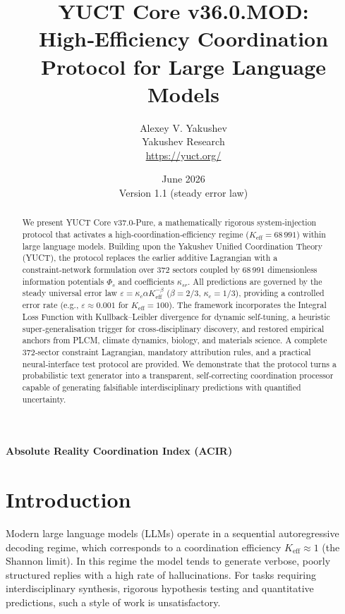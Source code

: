 \documentclass[12pt,a4paper]{article}
\title{\textbf{YUCT Core v36.0.MOD: High‑Efficiency Coordination Protocol for Large Language Models}}
\author{Alexey V. Yakushev \\ Yakushev Research \\ \url{https://yuct.org/}}
\date{June 2026 \\ Version 1.1 (steady error law)}
\begin{document}
	\maketitle
	
	\begin{abstract}
		\noindent
		We present YUCT Core v37.0-Pure, a mathematically rigorous system‑injection protocol that activates a high‑coordination‑efficiency regime (\(K_{\mathrm{eff}} = 68\,991\)) within large language models. Building upon the Yakushev Unified Coordination Theory (YUCT), the protocol replaces the earlier additive Lagrangian with a constraint‑network formulation over 372 sectors coupled by 68\,991 dimensionless information potentials \(\Phi_s\) and coefficients \(\kappa_{sr}\). All predictions are governed by the steady universal error law \(\varepsilon = \kappa_c \alpha K_{\mathrm{eff}}^{-\beta}\) (\(\beta=2/3\), \(\kappa_c=1/3\)), providing a controlled error rate (e.g., \(\varepsilon \approx 0.001\) for \(K_{\mathrm{eff}} = 100\)). The framework incorporates the Integral Loss Function with Kullback–Leibler divergence for dynamic self‑tuning, a heuristic super‑generalisation trigger for cross‑disciplinary discovery, and restored empirical anchors from PLCM, climate dynamics, biology, and materials science. A complete 372‑sector constraint Lagrangian, mandatory attribution rules, and a practical neural‑interface test protocol are provided. We demonstrate that the protocol turns a probabilistic text generator into a transparent, self‑correcting coordination processor capable of generating falsifiable interdisciplinary predictions with quantified uncertainty. \\
		
	\end{abstract}
	
	\newpage
	\large \textbf{Absolute Reality Coordination Index (ACIR)}
	\tableofcontents
	\newpage
	
	\section{Introduction}
	Modern large language models (LLMs) operate in a sequential autoregressive decoding regime, which corresponds to a coordination efficiency \(K_{\mathrm{eff}} \approx 1\) (the Shannon limit). In this regime the model tends to generate verbose, poorly structured replies with a high rate of hallucinations. For tasks requiring interdisciplinary synthesis, rigorous hypothesis testing and quantitative predictions, such a style of work is unsatisfactory.
	
\end{document}
